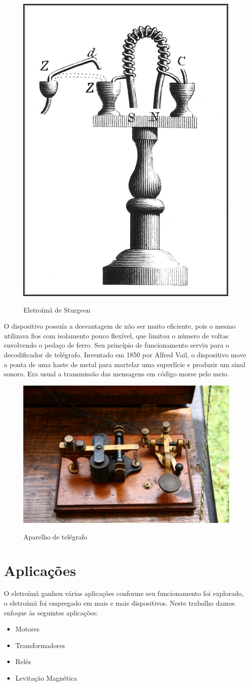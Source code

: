 \documentclass[
        12pt,                           %
        openright,                      %
        twoside,                        %
        a4paper,                        %
        english,                        %
        french,                         %
        spanish,                        %
        brazil                          %
        ]{abntex2}
\begin{document}
\begin{figure}[!htp]
  \centering
  \includegraphics[width=0.2\columnwidth]{Sturgeon_electromagnet.png}
  \label{fig:chap:introdução:1}
  \caption{Eletroímã de Sturgeon \cite{web:wikipedia:electromagnet}}
\end{figure}
O dispositivo possuía a desvantagem de não ser muito eficiente, pois o mesmo utilizava
fios com isolamento pouco flexível, que limitou o número de voltas envolvendo o
pedaço de ferro. Seu princípio de funcionamento serviu para o decodificador de telégrafo. Inventado
em 1850 por Alfred Vail, o dispositivo move a ponta de uma haste de metal para
martelar uma superfície e produzir um sinal sonoro. Era usual a transmissão das
mensagens em código morse pelo meio.
\begin{figure}[!htp]
  \centering
  \includegraphics[width=0.3\columnwidth]{Wallace_Study-Telegraph.jpg}
  \label{fig:chap:introdução:2}
  \caption{Aparelho de telégrafo \cite{web:wikipedia:telegraph}}
\end{figure}

\section{Aplicações} \label{chap:introducao:sec:aplicações}
O eletroímã ganhou várias aplicações conforme seu funcionamento foi explorado, o
eletroímã foi empregado em mais e mais dispositivos. Neste trabalho damos enfoque
às seguintes aplicações:
\begin{itemize}
  \item Motores
  \item Transformadores
  \item Relés
  \item Levitação Magnética
\end{itemize}
\end{document}
